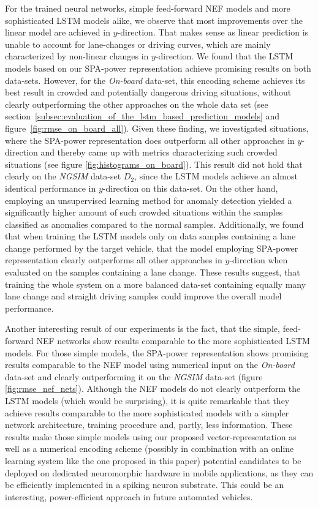 For the trained neural networks, simple feed-forward \ac{NEF} models and more sophisticated \ac{LSTM} models alike, we observe that most improvements over the linear model are achieved in $y$-direction.
That makes sense as linear prediction is unable to account for lane-changes or driving curves, which are mainly characterized by non-linear changes in $y$-direction.
We found that the \ac{LSTM} models based on our \ac{SPA}-power representation achieve promising results on both data-sets.
However, for the \emph{On-board} data-set, this encoding scheme achieves its best result in crowded and potentially dangerous driving situations, without clearly outperforming the other approaches on the whole data set (see section~\ref{subsec:evaluation_of_the_lstm_based_prediction_models} and figure~\ref{fig:rmse_on_board_all}).
Given these finding, we investigated situations, where the \ac{SPA}-power representation does outperform all other approaches in $y$-direction and thereby came up with metrics characterizing such crowded situations (see figure \ref{fig:histograms_on_board}).
This result did not hold that clearly on the \emph{\ac{NGSIM}} data-set $D_2$, since the \ac{LSTM} models achieve an almost identical performance in $y$-direction on this data-set.
On the other hand, employing an unsupervised learning method for anomaly detection yielded a significantly higher amount of such crowded situations within the samples classified as anomalies compared to the normal samples.
Additionally, we found that when training the \ac{LSTM} models only on data samples containing a lane change performed by the target vehicle, that the model employing \ac{SPA}-power representation clearly outperforms all other approaches in $y$-direction when evaluated on the samples containing a lane change.
These results suggest, that training the whole system on a more balanced data-set containing equally many lane change and straight driving samples could improve the overall model performance.

Another interesting result of our experiments is the fact, that the simple, feed-forward \ac{NEF} networks show results comparable to the more sophisticated \ac{LSTM} models.
For those simple models, the \ac{SPA}-power representation shows promising results comparable to the \ac{NEF} model using numerical input on the \emph{On-board} data-set and clearly outperforming it on the \emph{\ac{NGSIM}} data-set (figure \ref{fig:rmse_nef_nets}).
Although the \ac{NEF} models do not clearly outperform the \ac{LSTM} models (which would be surprising), it is quite remarkable that they achieve results comparable to the more sophisticated models with a simpler network architecture, training procedure and, partly, less information.
These results make those simple models using our proposed vector-representation as well as a numerical encoding scheme (possibly in combination with an online learning system like the one proposed in this paper) potential candidates to be deployed on dedicated neuromorphic hardware in mobile applications, as they can be efficiently implemented in a spiking neuron substrate.
This could be an interesting, power-efficient approach in future automated vehicles.

